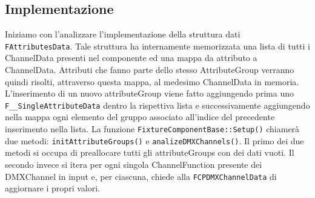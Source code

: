 \documentclass[main.tex]{subfiles}
\begin{document}
\subsection{Implementazione}\label{subsec:3_implementation}
Iniziamo con l'analizzare l'implementazione della struttura dati \lstinline{FAttributesData}. Tale struttura ha internamente memorizzata una lista di tutti i ChannelData presenti nel componente ed una mappa da attributo a ChannelData. Attributi che fanno parte dello stesso AttributeGroup verranno quindi risolti, attraverso questa mappa, al medesimo ChannelData in memoria. \newline
\lstset{language=UEcpp}
%
L'inserimento di un nuovo attributeGroup viene fatto aggiungendo prima uno \lstinline{F__SingleAttributeData} dentro la rispettiva lista e successivamente aggiungendo nella mappa ogni elemento del gruppo associato all'indice del precedente inserimento nella lista.\newline
La funzione \lstinline{FixtureComponentBase::Setup()} chiamerà due metodi: \lstinline{initAttributeGroups()} e \lstinline{analizeDMXChannels()}. Il primo dei due metodi si occupa di preallocare tutti gli attributeGroups con dei dati vuoti.
%
Il secondo invece si itera per ogni singola ChannelFunction presente dei DMXChannel in input e, per ciascuna, chiede alla \lstinline{FCPDMXChannelData} di aggiornare i propri valori. \newline
\end{document}
